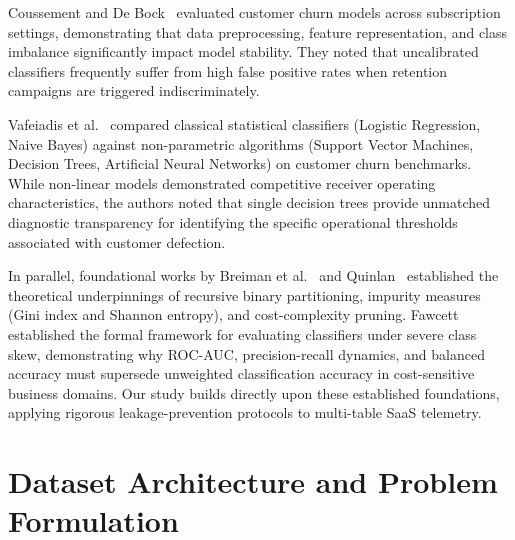 \documentclass[pdflatex,sn-mathphys-num]{sn-jnl}
\begin{document}
Coussement and De Bock~\cite{coussement2013customer} evaluated customer churn models across subscription settings, demonstrating that data preprocessing, feature representation, and class imbalance significantly impact model stability. They noted that uncalibrated classifiers frequently suffer from high false positive rates when retention campaigns are triggered indiscriminately.

Vafeiadis et al.~\cite{vafeiadis2015comparison} compared classical statistical classifiers (Logistic Regression, Naive Bayes) against non-parametric algorithms (Support Vector Machines, Decision Trees, Artificial Neural Networks) on customer churn benchmarks. While non-linear models demonstrated competitive receiver operating characteristics, the authors noted that single decision trees provide unmatched diagnostic transparency for identifying the specific operational thresholds associated with customer defection.

In parallel, foundational works by Breiman et al.~\cite{breiman1984classification} and Quinlan~\cite{quinlan1986induction} established the theoretical underpinnings of recursive binary partitioning, impurity measures (Gini index and Shannon entropy), and cost-complexity pruning. Fawcett~\cite{fawcett2006introduction} established the formal framework for evaluating classifiers under severe class skew, demonstrating why ROC-AUC, precision-recall dynamics, and balanced accuracy must supersede unweighted classification accuracy in cost-sensitive business domains. Our study builds directly upon these established foundations, applying rigorous leakage-prevention protocols to multi-table SaaS telemetry.

\section{Dataset Architecture and Problem Formulation}\label{sec:dataset}
\end{document}
